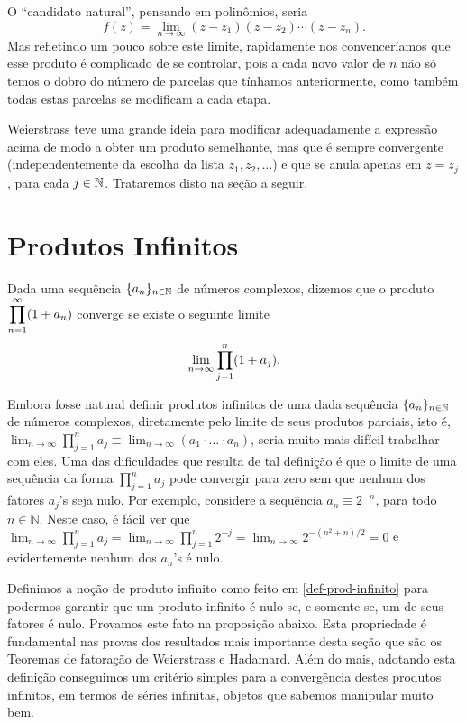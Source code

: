     O ``candidato natural'', pensando em polinômios, seria
    \begin{equation*}
        f(z) = \lim_{n\to\infty} (z-z_1)(z-z_2)\cdots(z - z_n).
    \end{equation*}
    Mas refletindo um pouco sobre este limite, 
    rapidamente nos convenceríamos que esse produto 
    é complicado de se controlar, pois a cada novo valor de $n$ não
    só temos o dobro do número de parcelas que tínhamos anteriormente, como também todas estas parcelas se modificam a cada etapa.
    
    Weierstrass teve uma grande ideia para modificar 
    adequadamente a expressão acima de modo a
    obter um produto semelhante, mas que é sempre
    convergente (independentemente da escolha da lista $z_1,z_2,\ldots$) 
    e que se anula apenas em $z=z_j$, para cada $j\in\mathbb{N}$. 
    Trataremos disto na seção a seguir.
    
\section{Produtos Infinitos}
    Dada uma sequência $\{ a_n \}_{n\in\mathbb{N}}$ de números complexos, dizemos que o
    produto $\displaystyle{ \prod_{n=1}^{\infty} (1+a_n) }$ converge se existe o seguinte limite
    \begin{equation}
    \index{Convergência!de produtos infinitos}
    \label{def-prod-infinito}
        \lim_{n\to\infty} \prod_{j=1}^n (1+a_j).
    \end{equation}
    
    
    Embora fosse natural definir produtos infinitos de uma 
    dada sequência $\{ a_n \}_{n\in\mathbb{N}}$ de números complexos,
    diretamente pelo limite de seus produtos parciais, isto é, 
    $
    \lim_{n\to\infty} \prod_{j=1}^n a_j 
    \equiv 
    \lim_{n\to\infty}(a_1\cdot\ldots\cdot a_n)
    $, 
    seria muito mais difícil trabalhar com eles.
    Uma das dificuldades que resulta de tal definição é que o limite 
    de uma sequência da forma 
    $\prod_{j=1}^n a_j$
    pode convergir para zero sem que 
    nenhum dos fatores $a_j$'s seja nulo. 
    Por exemplo, considere a sequência $a_n\equiv 2^{-n}$, para todo 
    $n\in\mathbb{N}$. Neste caso, é fácil ver que 
    $
    \lim_{n\to\infty}\prod_{j=1}^n a_j
    =
    \lim_{n\to\infty}\prod_{j=1}^n 2^{-j} 
    = 
    \lim_{n\to\infty}2^{-(n^2+n)/2}
    =
    0
    $
    e evidentemente nenhum dos $a_n$'s é nulo.
    
    Definimos a noção de produto infinito 
    como feito em \eqref{def-prod-infinito} para podermos garantir
    que um produto infinito é nulo se, e somente se,
    um de seus fatores é nulo. 
    Provamos este fato na proposição abaixo.
    Esta propriedade é fundamental nas provas dos 
    resultados mais importante desta
    seção que são os Teoremas de fatoração de Weierstrass e Hadamard. 
    Além do mais, adotando esta definição 
    conseguimos um critério simples para a convergência destes
    produtos infinitos, em termos de séries infinitas, objetos que 
    sabemos manipular muito bem.
    
